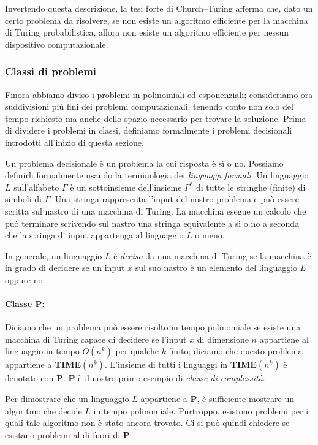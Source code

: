 Invertendo questa descrizione, la tesi forte di Church–Turing afferma che, dato un certo problema da risolvere, se non esiste un algoritmo efficiente per la macchina di Turing probabilistica, allora non esiste un algoritmo efficiente per nessun dispositivo computazionale.

\subsubsection*{Classi di problemi}
Finora abbiamo diviso i problemi in polinomiali ed esponenziali; consideriamo ora suddivisioni più fini dei problemi computazionali, tenendo conto non solo del tempo richiesto ma anche dello spazio necessario per trovare la soluzione. Prima di dividere i problemi in classi, definiamo formalmente i problemi decisionali introdotti all'inizio di questa sezione.

Un problema decisionale è un problema la cui risposta è sì o no. Possiamo definirli formalmente usando la terminologia dei \emph{linguaggi formali}. Un linguaggio $L$ sull'alfabeto $\Gamma$ è un sottoinsieme dell'insieme $\Gamma^*$ di tutte le stringhe (finite) di simboli di $\Gamma$. Una stringa rappresenta l'input del nostro problema e può essere scritta sul nastro di una macchina di Turing. La macchina esegue un calcolo che può terminare scrivendo sul nastro una stringa equivalente a sì o no a seconda che la stringa di input appartenga al linguaggio $L$ o meno.

In generale, un linguaggio $L$ è \emph{deciso} da una macchina di Turing se la macchina è in grado di decidere se un input $x$ sul suo nastro è un elemento del linguaggio $L$ oppure no.

\paragraph{Classe P:} Diciamo che un problema può essere risolto in tempo polinomiale se esiste una macchina di Turing capace di decidere se l'input $x$ di dimensione $n$ appartiene al linguaggio in tempo $O(n^k)$ per qualche $k$ finito; diciamo che questo problema appartiene a \textbf{TIME}$(n^k)$. L'insieme di tutti i linguaggi in \textbf{TIME}$(n^k)$ è denotato con \textbf{P}. \textbf{P} è il nostro primo esempio di \emph{classe di complessità}.

Per dimostrare che un linguaggio $L$ appartiene a \textbf{P}, è sufficiente mostrare un algoritmo che decide $L$ in tempo polinomiale. Purtroppo, esistono problemi per i quali tale algoritmo non è stato ancora trovato. Ci si può quindi chiedere se esistano problemi al di fuori di \textbf{P}.

